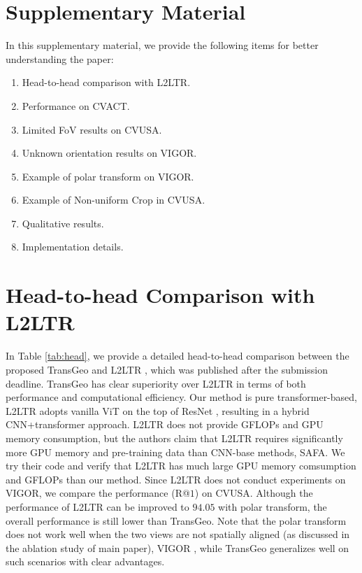 \documentclass[10pt,twocolumn,letterpaper]{article}
\begin{document}
\clearpage
\appendix
\normalsize


\section*{Supplementary Material}
In this supplementary material, we  provide  the  following items for better understanding the paper:
\begin{enumerate}
\item Head-to-head comparison with L2LTR.
    \item Performance on CVACT.
    \item Limited FoV results on CVUSA.
    \item Unknown orientation results on VIGOR.
    \item Example of polar transform on VIGOR.
    \item Example of Non-uniform Crop in CVUSA.
    \item Qualitative results.
    \item Implementation details.
    
\end{enumerate}










\section{Head-to-head Comparison with L2LTR}
In Table \ref{tab:head}, we provide a detailed head-to-head comparison between the proposed TransGeo and L2LTR \cite{yang2021cross}, which was published after the submission deadline. TransGeo has clear superiority over L2LTR in terms of both performance and computational efficiency. Our method is pure transformer-based, L2LTR adopts vanilla ViT \cite{vit} on the top of ResNet \cite{he2016deep}, resulting in a hybrid CNN+transformer approach. L2LTR \cite{yang2021cross} does not provide GFLOPs and GPU memory consumption, but the authors claim that L2LTR requires significantly more GPU memory and pre-training data than CNN-base methods, \ie SAFA. We try their code and verify that L2LTR has much large GPU memory comsumption and GFLOPs than our method. Since L2LTR does not conduct experiments on VIGOR, we compare the performance (R@$1$) on CVUSA.
Although the performance of L2LTR can be improved to $94.05$ with polar transform, the overall performance is still lower than TransGeo. Note that the polar transform does not work well when the two views are not spatially aligned (as discussed in the ablation study of main paper), \eg VIGOR \cite{zhu2021vigor}, while TransGeo generalizes well on such scenarios with clear advantages.
\end{document}
